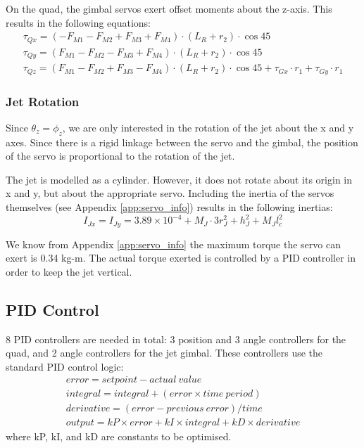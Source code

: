 \documentclass[11pt]{article}
\begin{document}
On the quad, the gimbal servos exert offset moments about the z-axis. This results in the following equations:
\begin{eqnarray}
    \tau_{Qx} = (-F_{M1} - F_{M2} + F_{M3} + F_{M4})\cdot(L_R + r_2)\cdot \cos{45} \\
    \tau_{Qy} = (F_{M1} - F_{M2} - F_{M3} + F_{M4})\cdot(L_R + r_2)\cdot \cos{45} \\
    \tau_{Qz} = (F_{M1} - F_{M2} + F_{M3} - F_{M4})\cdot(L_R + r_2)\cdot \cos{45} + \tau_{Gx}\cdot r_1 + \tau_{Gy}\cdot r_1
\end{eqnarray}

\subsubsection{Jet Rotation}
Since $\theta_z = \phi_z$, we are only interested in the rotation of the jet about the x and y axes. Since there is a rigid linkage between the servo and the gimbal, the position of the servo is proportional to the rotation of the jet.

The jet is modelled as a cylinder. However, it does not rotate about its origin in x and y, but about the appropriate servo. Including the inertia of the servos themselves (see Appendix \ref{app:servo_info}) results in the following inertias:
\begin{equation}
    I_{Jx} = I_{Jy} = 3.89\times10^{-4} + M_J\cdot3r_J^2 + h_J^2 + M_Jl_c^2
\end{equation}

We know from Appendix \ref{app:servo_info} the maximum torque the servo can exert is 0.34 kg-m. The actual torque exerted is controlled by a PID controller in order to keep the jet vertical.

\subsection{PID Control}
8 PID controllers are needed in total: 3 position and 3 angle controllers for the quad, and 2 angle controllers for the jet gimbal. These controllers use the standard PID control logic:
\begin{eqnarray*}
    error = setpoint - actual\ value \\
    integral = integral + (error \times time\ period) \\
    derivative = (error - previous\ error)/time \\
    output = kP \times error + kI \times integral + kD \times derivative
\end{eqnarray*}
where kP, kI, and kD are constants to be optimised.
\end{document}
